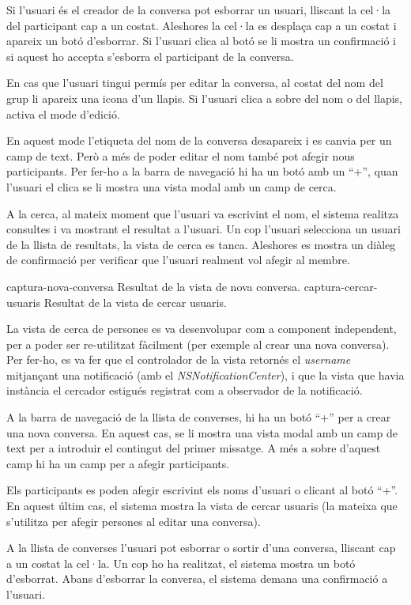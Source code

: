 Si l'usuari és el creador de la conversa pot esborrar un usuari, lliscant la cel·la del participant cap a un costat. Aleshores la cel·la es desplaça cap a un costat i apareix un botó d'esborrar. Si l'usuari clica al botó se li mostra un confirmació i si aquest ho accepta s'esborra el participant de la conversa.

En cas que l'usuari tingui permís per editar la conversa, al costat del nom del grup li apareix una icona d'un llapis. Si l'usuari clica a sobre del nom o del llapis, activa el mode d'edició. 

En aquest mode l'etiqueta del nom de la conversa desapareix i es canvia per un camp de text. Però a més de poder editar el nom també pot afegir nous participants. Per fer-ho a la barra de navegació hi ha un botó amb un ``+'', quan l'usuari el clica se li mostra una vista modal amb un camp de cerca. 

A la cerca, al mateix moment que l'usuari va escrivint el nom, el sistema realitza consultes i va mostrant el resultat a l'usuari. Un cop l'usuari selecciona un usuari de la llista de resultats, la vista de cerca es tanca. Aleshores es mostra un diàleg de confirmació per verificar que l'usuari realment vol afegir al membre. 

\pintaDosImatges
    {captura-nova-conversa}
        {Resultat de la vista de nova conversa.}
    {captura-cercar-usuaris}
        {Resultat de la vista de cercar usuaris.}

La vista de cerca de persones es va desenvolupar com a component independent, per a poder ser re-utilitzat fàcilment (per exemple al crear una nova conversa). Per fer-ho, es va fer que el controlador de la vista retornés el \textit{username} mitjançant una notificació (amb el \textit{NSNotificationCenter}), i que la vista que havia instància el cercador estigués registrat com a observador de la notificació. 
        
A la barra de navegació de la llista de converses, hi ha un botó ``+'' per a crear una nova conversa. En aquest cas, se li mostra una vista modal amb un camp de text per a introduir el contingut del primer missatge. A més a sobre d'aquest camp hi ha un camp per a afegir participants.

Els participants es poden afegir escrivint els noms d'usuari o clicant al botó ``+''. En aquest últim cas, el sistema mostra la vista de cercar usuaris (la mateixa que s'utilitza per afegir persones al editar una conversa).

A la llista de converses l'usuari pot esborrar o sortir d'una conversa, lliscant cap a un costat la cel·la. Un cop ho ha realitzat, el sistema mostra un botó d'esborrat. Abans d'esborrar la conversa, el sistema demana una confirmació a l'usuari.





















